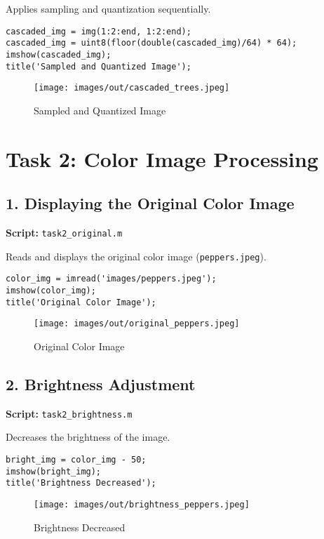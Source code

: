 \documentclass[12pt,a4paper]{article}
\begin{document}
Applies sampling and quantization sequentially.

\begin{verbatim}
cascaded_img = img(1:2:end, 1:2:end);
cascaded_img = uint8(floor(double(cascaded_img)/64) * 64);
imshow(cascaded_img);
title('Sampled and Quantized Image');
\end{verbatim}

\begin{figure}[H]
    \centering
    \texttt{[image: images/out/cascaded\_trees.jpeg]}
    \caption{Sampled and Quantized Image}
\end{figure}

\section*{Task 2: Color Image Processing}

\subsection*{1. Displaying the Original Color Image}
\textbf{Script:} \texttt{task2\_original.m}

Reads and displays the original color image (\texttt{peppers.jpeg}).

\begin{verbatim}
color_img = imread('images/peppers.jpeg');
imshow(color_img);
title('Original Color Image');
\end{verbatim}

\begin{figure}[H]
    \centering
    \texttt{[image: images/out/original\_peppers.jpeg]}
    \caption{Original Color Image}
\end{figure}

\subsection*{2. Brightness Adjustment}
\textbf{Script:} \texttt{task2\_brightness.m}

Decreases the brightness of the image.

\begin{verbatim}
bright_img = color_img - 50;
imshow(bright_img);
title('Brightness Decreased');
\end{verbatim}

\begin{figure}[H]
    \centering
    \texttt{[image: images/out/brightness\_peppers.jpeg]}
    \caption{Brightness Decreased}
\end{figure}
\end{document}
